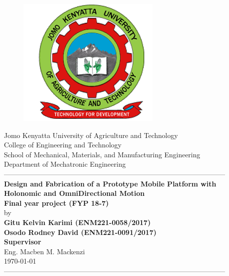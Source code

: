 \documentclass[12pt,fleqn]{article}
\newcommand{\yesthreeday}{{\AdvanceDate[-4]\today}}
\begin{document}
\begin{titlepage}
  \begin{center}
      \vspace*{-4.0cm}
    \begin{figure}[!h]
\centering
\includegraphics[width=0.3\linewidth]{Figures/JKUAT_logo}
\label{fig:jomologo}
\end{figure}
   \large{Jomo Kenyatta University of Agriculture and Technology}\\
    \large{College of Engineering and Technology}\\
    \large{School of Mechanical, Materials, and Manufacturing Engineering}\\
   \large{Department of Mechatronic Engineering}\\

    ------------------------------------------------------------------------------------------------\\[1.0cm]
    \LARGE{\textbf{Design and Fabrication of a Prototype Mobile Platform with Holonomic and OmniDirectional Motion}}\\[0.6cm]
    \LARGE{\textbf{Final year project (FYP 18-7)
            }}\\[0.4cm]
    \vspace{0.3cm}
    \large{by}\\[0.3cm]

    \vspace{0.3cm}
    \large{\textbf{Gitu Kelvin Karimi (ENM221-0058/2017)
            }}\\
     \large{\textbf{Osodo Rodney David (ENM221-0091/2017)
            }}\\[0.4cm]
    \large{\textbf{Supervisor}}\\
    \large{Eng. Macben M. Mackenzi}\\[0.2cm]
    \vfill
    \large{\small{\yesthreeday}}\\
    ------------------------------------------------------------------------------------------------\\[1.5cm]
  \end{center}
\end{titlepage}
%

\clearpage
{}
\tableofcontents
\clearpage
{}
\end{document}
